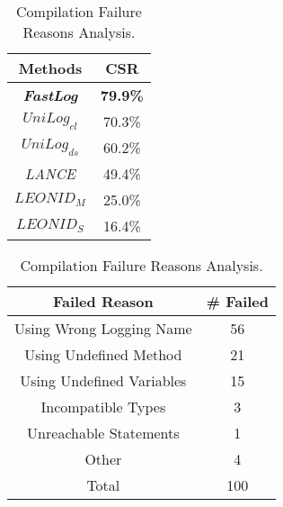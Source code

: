 \begin{table}[h]
    \centering
    \begin{minipage}{0.45\textwidth}
\caption{Compilation Failure Rates Across Methods.}
\label{table:compile_failed_rate}
\centering
\setlength\tabcolsep{12pt}  %
\renewcommand{\arraystretch}{1.1}  %
\scalebox{1.1} {  %
\begin{tabular}{c|c}
    \toprule
\textbf{Methods} & \textbf{CSR} \\  
\midrule
\textit{\textbf{FastLog}} & \textbf{79.9\%} \\ 
\(UniLog_{{cl}}\) & 70.3\% \\ 
\(UniLog_{{ds}}\) & 60.2\% \\ 
\textit{LANCE} & 49.4\% \\ 
\(LEONID_M\) & 25.0\% \\
\(LEONID_S\) & 16.4\% \\ 
\bottomrule
\end{tabular}
}
    \end{minipage}
    \hfill
    \begin{minipage}{0.5\textwidth}
\caption{Compilation Failure Reasons Analysis.}
\label{table:compile_failed_reason}
\centering
\setlength\tabcolsep{12pt}  %
\renewcommand{\arraystretch}{1.1}  %
\scalebox{1} {  %
\begin{tabular}{c|c}
    \toprule
\textbf{Failed Reason} & \textbf{\# Failed} \\     \midrule
Using Wrong Logging Name & 56 \\ 
Using Undefined Method & 21 \\ 
Using Undefined Variables & 15 \\ 
Incompatible Types & 3 \\
Unreachable Statements & 1 \\ 
Other & 4 \\     \midrule
Total & 100 \\
\bottomrule
\end{tabular}
}
    \end{minipage}
\end{table}